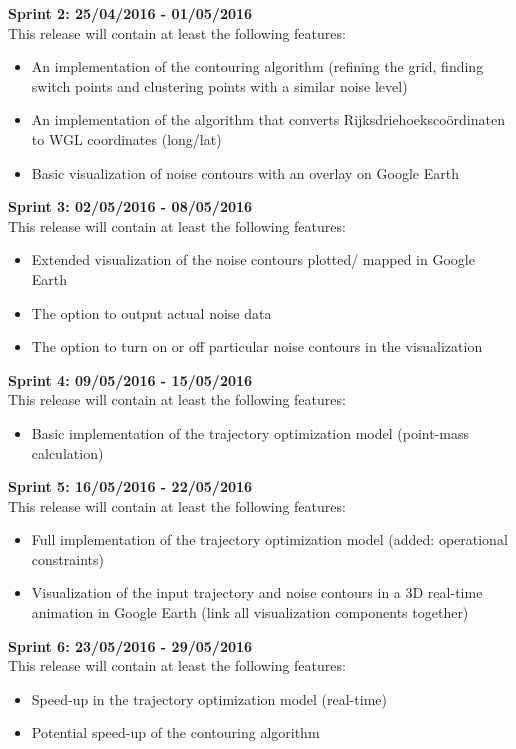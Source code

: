 ﻿\documentclass[a4paper,english,fleqn]{exam}
\begin{document}
\textbf{Sprint 2: 25/04/2016 - 01/05/2016 } \\
This release will contain at least the following features:
\begin{itemize}
\item An implementation of the contouring algorithm (refining the grid, finding switch points and clustering points with a similar noise level)
\item An implementation of the algorithm that converts Rijksdriehoekscoördinaten to WGL coordinates (long/lat)
\item Basic visualization of noise contours with an overlay on Google Earth
\end{itemize}

\textbf{Sprint 3: 02/05/2016 - 08/05/2016} \\
This release will contain at least the following features:
\begin{itemize}
\item Extended visualization of the noise contours plotted/ mapped in Google Earth
\item The option to output actual noise data
\item The option to turn on or off particular noise contours in the visualization
\end{itemize}

\textbf{Sprint 4: 09/05/2016 - 15/05/2016} \\
This release will contain at least the following features:
\begin{itemize}
\item Basic implementation of the trajectory optimization model (point-mass calculation)
\end{itemize}

\textbf{Sprint 5: 16/05/2016 - 22/05/2016} \\
This release will contain at least the following features:
\begin{itemize}
\item Full implementation of the trajectory optimization model (added: operational constraints)
\item Visualization of the input trajectory and noise contours in a 3D real-time animation in Google Earth (link all visualization components together)
\end{itemize}

\textbf{Sprint 6: 23/05/2016 - 29/05/2016} \\
This release will contain at least the following features:
\begin{itemize}
\item Speed-up in the trajectory optimization model (real-time)
\item Potential speed-up of the contouring algorithm
\end{itemize}
\end{document}
